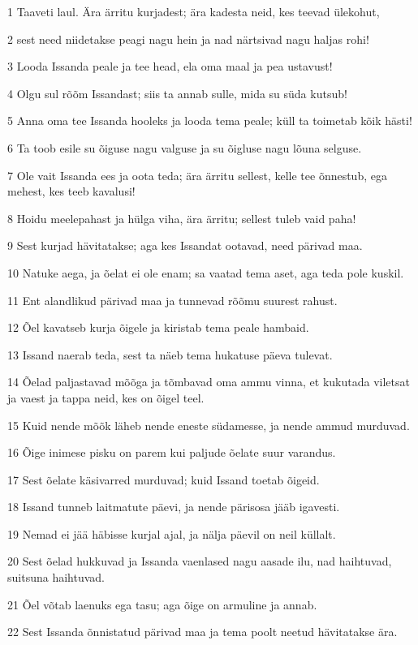 \par 1 Taaveti laul. Ära ärritu kurjadest; ära kadesta neid, kes teevad ülekohut,
\par 2 sest need niidetakse peagi nagu hein ja nad närtsivad nagu haljas rohi!
\par 3 Looda Issanda peale ja tee head, ela oma maal ja pea ustavust!
\par 4 Olgu sul rõõm Issandast; siis ta annab sulle, mida su süda kutsub!
\par 5 Anna oma tee Issanda hooleks ja looda tema peale; küll ta toimetab kõik hästi!
\par 6 Ta toob esile su õiguse nagu valguse ja su õigluse nagu lõuna selguse.
\par 7 Ole vait Issanda ees ja oota teda; ära ärritu sellest, kelle tee õnnestub, ega mehest, kes teeb kavalusi!
\par 8 Hoidu meelepahast ja hülga viha, ära ärritu; sellest tuleb vaid paha!
\par 9 Sest kurjad hävitatakse; aga kes Issandat ootavad, need pärivad maa.
\par 10 Natuke aega, ja õelat ei ole enam; sa vaatad tema aset, aga teda pole kuskil.
\par 11 Ent alandlikud pärivad maa ja tunnevad rõõmu suurest rahust.
\par 12 Õel kavatseb kurja õigele ja kiristab tema peale hambaid.
\par 13 Issand naerab teda, sest ta näeb tema hukatuse päeva tulevat.
\par 14 Õelad paljastavad mõõga ja tõmbavad oma ammu vinna, et kukutada viletsat ja vaest ja tappa neid, kes on õigel teel.
\par 15 Kuid nende mõõk läheb nende eneste südamesse, ja nende ammud murduvad.
\par 16 Õige inimese pisku on parem kui paljude õelate suur varandus.
\par 17 Sest õelate käsivarred murduvad; kuid Issand toetab õigeid.
\par 18 Issand tunneb laitmatute päevi, ja nende pärisosa jääb igavesti.
\par 19 Nemad ei jää häbisse kurjal ajal, ja nälja päevil on neil küllalt.
\par 20 Sest õelad hukkuvad ja Issanda vaenlased nagu aasade ilu, nad haihtuvad, suitsuna haihtuvad.
\par 21 Õel võtab laenuks ega tasu; aga õige on armuline ja annab.
\par 22 Sest Issanda õnnistatud pärivad maa ja tema poolt neetud hävitatakse ära.
